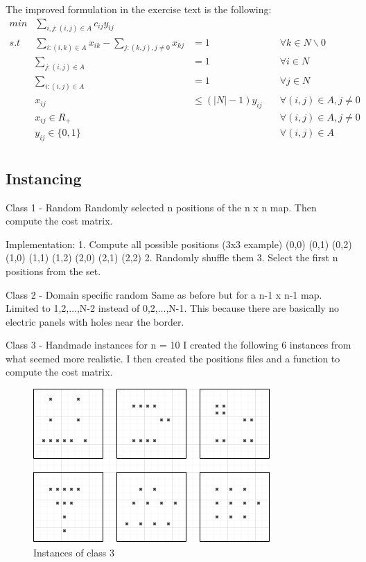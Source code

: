 \documentclass[a4paper, 11pt]{article}
\begin{document}
			The improved formulation in the exercise text is the following:
			\begin{align}
				min &\sum_{i,j:(i,j)\in A} c_{ij} y_{ij}\\
				s.t &\sum_{i:(i,k)\in A} x_{ik} - \sum_{j:(k,j),j\ne 0} x_{kj} &= 1 \qquad\qquad\qquad &\forall k \in N \backslash 0 \\
				&\sum_{j:(i,j)\in A} 	&= 1 \qquad \qquad \qquad 				&\forall i \in N \\
				&\sum_{i:(i,j)\in A} 	&= 1 \qquad \qquad \qquad 				&\forall j \in N \\
				&x_{ij}  				&\le (|N|-1) y_{ij} \quad 	&\forall (i,j) \in A, j\ne 0 \\
				&x_{ij}  \in R_+ 		&   						&\forall (i,j) \in A, j\ne 0 \\
				&y_{ij}  \in \{0,1\} 	&  							&\forall (i,j) \in A \\
			\end{align}
				
		
		
		\subsection{Instancing}
			Class 1 - Random
				Randomly selected n positions of the n x n map.
				Then compute the cost matrix.
				
				Implementation:
				1. Compute all possible positions (3x3 example)
					(0,0) (0,1) (0,2) 
					(1,0) (1,1) (1,2)
					(2,0) (2,1) (2,2)
				2. Randomly shuffle them
				3. Select the first n positions from the set.
				
			
			Class 2 - Domain specific random
				Same as before but for a n-1 x n-1 map.
				Limited to {1,2,$\ldots$,N-2} instead of {0,2,$\ldots$,N-1}.
				This because there are basically no electric panels with holes near the border.
				
			Class 3 - Handmade instances for n = 10	
				I created the following 6 instances from what seemed more realistic.
				I then created the positions files and a function to compute the cost matrix.
				
				\begin{figure}[H]
					\centering
					\includegraphics[width=.99\linewidth]{class3.png}  
					\caption{Instances of class 3}
					\label{fig:figsClass3}
				\end{figure}
			
\end{document}

